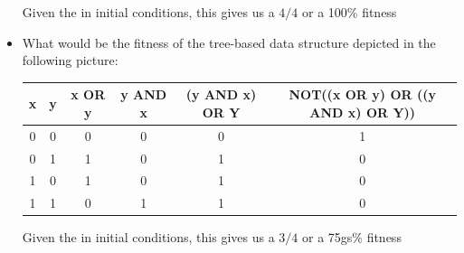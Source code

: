 \documentclass{article}
\begin{document}
\begin{itemize}
    Given the in initial conditions, this gives us a $4/4$ or a 100\% fitness

    \item What would be the fitness of the tree-based data structure depicted in the following picture:
    \begin{table}[h]
        \centering
        \begin{tabular}{c|c|c|c|c|c}
            x & y & x OR y & y AND x & (y AND x) OR Y & NOT((x OR y) OR ((y AND x) OR Y)) \\
            \hline
            0 & 0 & 0 & 0 & 0 & 1 \\
            0 & 1 & 1 & 0 & 1 & 0 \\
            1 & 0 & 1 & 0 & 1 & 0 \\
            1 & 1 & 0 & 1 & 1 & 0 \\
        \end{tabular}
    \end{table}

    Given the in initial conditions, this gives us a $3/4$ or a 75gs\% fitness
\end{itemize}
\end{document}
